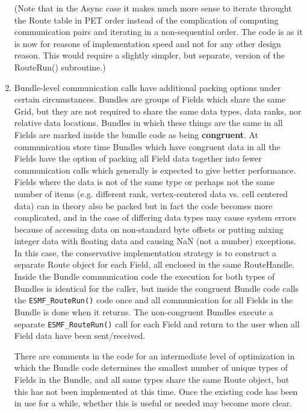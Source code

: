 \begin{enumerate}
\begin{enumerate}
\end{enumerate}
(Note that in the Async case it makes much more sense to iterate
throught the Route table in PET order instead of the complication
of computing communication pairs and iterating in a non-sequential
order.  The code is as it is now for reasons of implementation speed
and not for any other design reason.  This would require a slightly
simpler, but separate, version of the RouteRun() subroutine.)

\item

Bundle-level communication calls have additional packing options
under certain circumstances.  Bundles are groups of Fields which
share the same Grid, but they are not required to share the same
data types, data ranks, nor relative data locations.  Bundles
in which these things are the same in all Fields are marked inside the
bundle code as being {\bf congruent}.  At communication store time
Bundles which have congruent data in all the Fields have the option
of packing all Field data together into fewer communication calls
which generally is expected to give better performance.   
Fields where the data is not of the same type or perhaps not
the same number of items (e.g. different rank, vertex-centered data
vs. cell centered data) can in theory also be packed but in fact
the code becomes more complicated, and in the case of differing
data types may cause system errors because of accessing data
on non-standard byte offsets or putting mixing integer data
with floating data and causing NaN (not a number) exceptions.
In this case, the conservative implementation strategy is to construct 
a separate Route object for each Field, all enclosed in the same
RouteHandle.  Inside the Bundle communication code the execution
for both types of Bundles is identical for the caller, but inside
the congruent Bundle code calls the {\tt ESMF\_RouteRun()} code
once and all communication for all Fields in the Bundle is done
when it returns.  The non-congruent Bundles execute a separate
{\tt ESMF\_RouteRun()} call for each Field and return to the user 
when all Field data have been sent/received.

There are comments in the code for an intermediate level of
optimization in which the Bundle code determines the smallest
number of unique types of Fields in the Bundle, and all same types
share the same Route object, but this has not been implemented
at this time.  Once the existing code has been in use for a while,
whether this is useful or needed may become more clear.



\end{enumerate}
